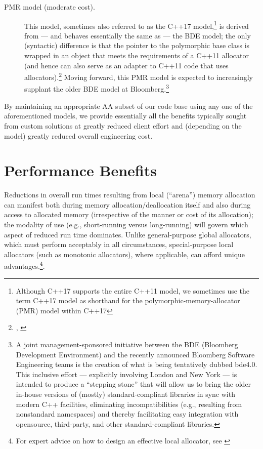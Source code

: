 \begin{description}
\item[PMR model (moderate cost).] This model, sometimes also referred to as the
C++17 model,\footnote{Although C++17 supports the entire C++11 model, we sometimes use the term C++17 model as
shorthand for the polymorphic-memory-allocator (PMR) model within C++17} is derived from — and behaves essentially the same as — the
BDE model; the only (syntactic) difference is that the pointer to the polymorphic
base class is wrapped in an object that meets the requirements of a C++11
allocator (and hence can also serve as an adapter to C++11 code that uses
allocators).\footnote{\cite{halpern14}, \cite{halpern17}} Moving forward, this PMR model is expected to increasingly
supplant the older BDE model at Bloomberg.\footnote{A joint management-sponsored
initiative between the BDE (Bloomberg Development Environment)
and the recently announced Bloomberg Software Engineering teams is the creation of what is being
tentatively dubbed bde4.0. This inclusive effort — explicitly involving London and New York — is
intended to produce a “stepping stone” that will allow us to bring the older in-house versions of
(mostly) standard-compliant libraries in sync with modern C++ facilities, eliminating incompatibilities
(e.g., resulting from nonstandard namespaces) and thereby facilitating easy integration with opensource,
third-party, and other standard-compliant libraries.}

\end{description}

By maintaining an appropriate AA subset of our code base using any one of the
aforementioned models, we provide essentially all the benefits typically sought from
custom solutions at greatly reduced client effort and (depending on the model)
greatly reduced overall engineering cost.

\section{Performance Benefits}
Reductions in overall run times resulting from local (“arena”) memory allocation can
manifest both during memory allocation/deallocation itself and also during access
to allocated memory (irrespective of the manner or cost of its allocation); the
modality of use (e.g., short-running versus long-running) will govern which aspect of
reduced run time dominates. Unlike general-purpose global allocators, which must
perform acceptably in all circumstances, special-purpose local allocators (such as
monotonic allocators), where applicable, can afford unique advantages.\footnote{For
  expert advice on how to design an effective local allocator, see \cite{weis20}}.

